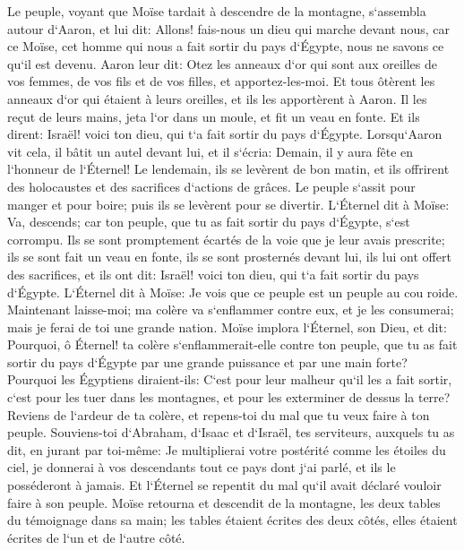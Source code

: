 \verse Le peuple, voyant que Moïse tardait à descendre de la montagne, s`assembla autour d`Aaron, et lui dit: Allons! fais-nous un dieu qui marche devant nous, car ce Moïse, cet homme qui nous a fait sortir du pays d`Égypte, nous ne savons ce qu`il est devenu. 
\verse Aaron leur dit: Otez les anneaux d`or qui sont aux oreilles de vos femmes, de vos fils et de vos filles, et apportez-les-moi. 
\verse Et tous ôtèrent les anneaux d`or qui étaient à leurs oreilles, et ils les apportèrent à Aaron. 
\verse Il les reçut de leurs mains, jeta l`or dans un moule, et fit un veau en fonte. Et ils dirent: Israël! voici ton dieu, qui t`a fait sortir du pays d`Égypte. 
\verse Lorsqu`Aaron vit cela, il bâtit un autel devant lui, et il s`écria: Demain, il y aura fête en l`honneur de l`Éternel! 
\verse Le lendemain, ils se levèrent de bon matin, et ils offrirent des holocaustes et des sacrifices d`actions de grâces. Le peuple s`assit pour manger et pour boire; puis ils se levèrent pour se divertir. 
\verse L`Éternel dit à Moïse: Va, descends; car ton peuple, que tu as fait sortir du pays d`Égypte, s`est corrompu. 
\verse Ils se sont promptement écartés de la voie que je leur avais prescrite; ils se sont fait un veau en fonte, ils se sont prosternés devant lui, ils lui ont offert des sacrifices, et ils ont dit: Israël! voici ton dieu, qui t`a fait sortir du pays d`Égypte. 
\verse L`Éternel dit à Moïse: Je vois que ce peuple est un peuple au cou roide. 
\verse Maintenant laisse-moi; ma colère va s`enflammer contre eux, et je les consumerai; mais je ferai de toi une grande nation. 
\verse Moïse implora l`Éternel, son Dieu, et dit: Pourquoi, ô Éternel! ta colère s`enflammerait-elle contre ton peuple, que tu as fait sortir du pays d`Égypte par une grande puissance et par une main forte? 
\verse Pourquoi les Égyptiens diraient-ils: C`est pour leur malheur qu`il les a fait sortir, c`est pour les tuer dans les montagnes, et pour les exterminer de dessus la terre? Reviens de l`ardeur de ta colère, et repens-toi du mal que tu veux faire à ton peuple. 
\verse Souviens-toi d`Abraham, d`Isaac et d`Israël, tes serviteurs, auxquels tu as dit, en jurant par toi-même: Je multiplierai votre postérité comme les étoiles du ciel, je donnerai à vos descendants tout ce pays dont j`ai parlé, et ils le posséderont à jamais. 
\verse Et l`Éternel se repentit du mal qu`il avait déclaré vouloir faire à son peuple. 
\verse Moïse retourna et descendit de la montagne, les deux tables du témoignage dans sa main; les tables étaient écrites des deux côtés, elles étaient écrites de l`un et de l`autre côté. 
